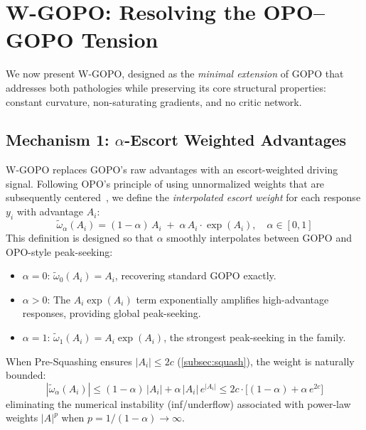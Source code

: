 \documentclass[11pt]{article}
\theoremstyle{definition}
\theoremstyle{remark}
\begin{document}
\section{W-GOPO: Resolving the OPO--GOPO Tension}
\label{sec:wgopo}

We now present W-GOPO, designed as the \emph{minimal extension} of GOPO that addresses both pathologies while preserving its core structural properties: constant curvature, non-saturating gradients, and no critic network.

\subsection{Mechanism 1: $\alpha$-Escort Weighted Advantages}
\label{subsec:escort}

W-GOPO replaces GOPO's raw advantages with an escort-weighted driving signal. Following OPO's principle of using unnormalized weights that are subsequently centered~\cite{Wang2025OPO}, we define the \emph{interpolated escort weight} for each response $y_i$ with advantage $A_i$:
\begin{equation}
\label{eq:escort}
    \tilde{\omega}_\alpha(A_i) = (1 - \alpha)\, A_i \;+\; \alpha\, A_i \cdot \exp(A_i), \quad \alpha \in [0, 1]
\end{equation}
This definition is designed so that $\alpha$ smoothly interpolates between GOPO and OPO-style peak-seeking:
\begin{itemize}[leftmargin=2em]
    \item $\alpha = 0$: $\tilde{\omega}_0(A_i) = A_i$, recovering standard GOPO exactly.
    \item $\alpha > 0$: The $A_i \exp(A_i)$ term exponentially amplifies high-advantage responses, providing global peak-seeking.
    \item $\alpha = 1$: $\tilde{\omega}_1(A_i) = A_i \exp(A_i)$, the strongest peak-seeking in the family.
\end{itemize}
When Pre-Squashing ensures $|A_i| \leq 2c$ (\cref{subsec:squash}), the weight is naturally bounded:
\begin{equation}
    |\tilde{\omega}_\alpha(A_i)| \leq (1 - \alpha)\,|A_i| + \alpha\,|A_i|\,e^{|A_i|} \leq 2c \cdot \big[(1-\alpha) + \alpha\,e^{2c}\big]
\end{equation}
eliminating the numerical instability (inf/underflow) associated with power-law weights $|A|^{p}$ when $p = 1/(1-\alpha) \to \infty$.
\end{document}
